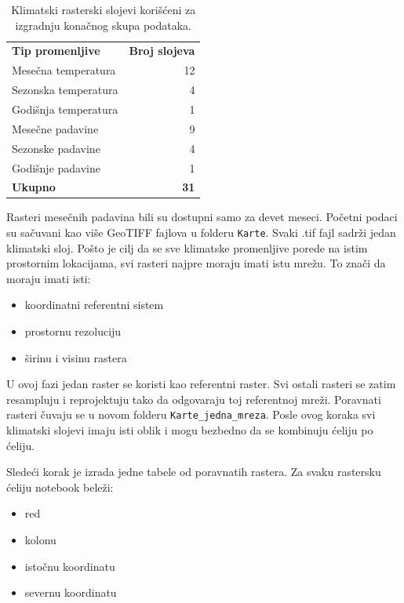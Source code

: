 \documentclass[11pt]{article}
\begin{document}
\begin{table}[H]
  \centering
  \label{tab:climate_layers}
  \begin{tabular}{lr}
    \textbf{Tip promenljive} & \textbf{Broj slojeva} \\
      Mesečna temperatura      & 12 \\
      Sezonska temperatura     & 4  \\
      Godišnja temperatura     & 1  \\
      Mesečne padavine         & 9  \\
      Sezonske padavine        & 4  \\
      Godišnje padavine        & 1  \\
    \textbf{Ukupno}           & \textbf{31} \\
  \end{tabular}
  \caption{Klimatski rasterski slojevi korišćeni za izgradnju konačnog skupa podataka.}
\end{table}

Rasteri mesečnih padavina bili su dostupni samo za devet meseci. Početni podaci su sačuvani kao više GeoTIFF fajlova u folderu \texttt{Karte}. Svaki .tif fajl sadrži jedan klimatski sloj. Pošto je cilj da se sve klimatske promenljive porede na istim prostornim lokacijama, svi rasteri najpre moraju imati istu mrežu. To znači da moraju imati isti:

\begin{itemize}
  \item koordinatni referentni sistem
  \item prostornu rezoluciju
  \item širinu i visinu rastera
\end{itemize}

U ovoj fazi jedan raster se koristi kao referentni raster. Svi ostali rasteri se zatim resampluju i reprojektuju tako da odgovaraju toj referentnoj mreži. Poravnati rasteri čuvaju se u novom folderu \texttt{Karte\_jedna\_mreza}. Posle ovog koraka svi klimatski slojevi imaju isti oblik i mogu bezbedno da se kombinuju ćeliju po ćeliju.

Sledeći korak je izrada jedne tabele od poravnatih rastera. Za svaku rastersku ćeliju notebook beleži:

\begin{itemize}
  \item red
  \item kolonu
  \item istočnu koordinatu
  \item severnu koordinatu
\end{itemize}
\end{document}
